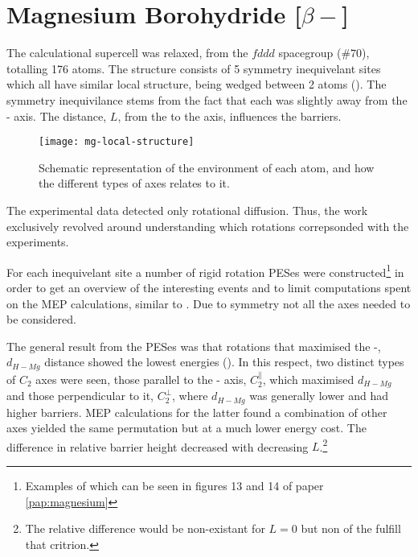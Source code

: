 \section{Magnesium Borohydride [$\beta-$]}
\label{sec:borohydrides-magnesium}

The calculational supercell was relaxed, from the $fddd$ spacegroup ($\#70$), totalling 176 atoms.
The structure consists of 5 symmetry inequivelant  sites which all have similar local structure, being wedged between 2  atoms ().
The symmetry inequivilance stems from the fact that each  was slightly away from the - axis.
The distance, $L$, from the  to the axis, influences the barriers.

\begin{figure}
\begin{center}
    \texttt{[image: mg-local-structure]}
    \parbox{0.85\linewidth}{
\caption{Schematic representation of the environment of each  atom, and how the different types of axes relates to it.
}
\label{fig:mg-local-structure}
}
\end{center}
\end{figure}

The experimental data detected only rotational diffusion.
Thus, the work exclusively revolved around understanding which rotations correpsonded with the experiments.

For each inequivelant site a number of rigid rotation PESes were constructed\footnote{Examples of which can be seen in figures 13 and 14 of paper \ref{pap:magnesium}} in order to get an overview of the interesting events and to limit computations spent on the MEP calculations, similar to .
Due to symmetry not all the axes needed to be considered.

The general result from the PESes was that rotations that maximised the -, $d_{H-Mg}$ distance showed the lowest energies ().
In this respect, two distinct types of $C_2$ axes were seen, those parallel to the - axis, $C_2^\parallel$, which maximised $d_{H-Mg}$ and those perpendicular to it, $C_2^\perp$, where $d_{H-Mg}$ was generally lower and had higher barriers.
MEP calculations for the latter found a combination of other axes yielded the same permutation but at a much lower energy cost.
The difference in relative barrier height decreased with decreasing $L$.\footnote{The relative difference would be non-existant for $L=0$ but non of the  fulfill that critrion.}


